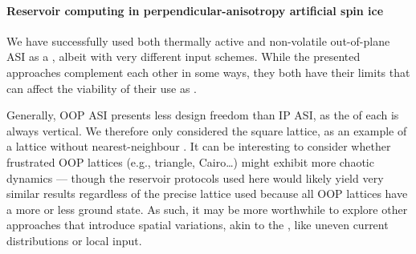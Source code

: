 \paragraph{Reservoir computing in perpendicular-anisotropy artificial spin ice}
We have successfully used both thermally active and non-volatile out-of-plane ASI as a , albeit with very different input schemes.
While the presented approaches complement each other in some ways, they both have their limits that can affect the viability of their use as . \\\par

Generally, OOP ASI presents less design freedom than IP ASI, as the  of each  is always vertical.
We therefore only considered the square lattice, as an example of a lattice without nearest-neighbour .
It can be interesting to consider whether frustrated OOP lattices (e.g., triangle, Cairo\dots) might exhibit more chaotic dynamics --- though the reservoir protocols used here would likely yield very similar results regardless of the precise lattice used because all OOP lattices have a more or less  ground state.
As such, it may be more worthwhile to explore other approaches that introduce spatial variations, akin to the , like uneven current distributions or local input. \\\par

